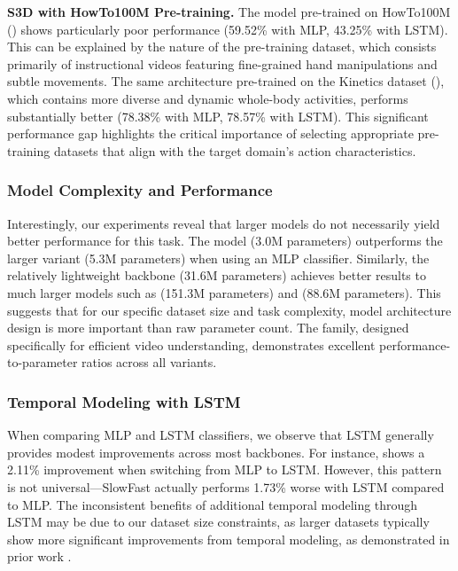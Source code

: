 \noindent\textbf{S3D with HowTo100M Pre-training.}
The  model pre-trained on HowTo100M () shows particularly poor performance (59.52\% with MLP, 43.25\% with LSTM). This can be explained by the nature of the pre-training dataset, which consists primarily of instructional videos featuring fine-grained hand manipulations and subtle movements. The same architecture pre-trained on the Kinetics dataset (), which contains more diverse and dynamic whole-body activities, performs substantially better (78.38\% with MLP, 78.57\% with LSTM). This significant performance gap highlights the critical importance of selecting appropriate pre-training datasets that align with the target domain's action characteristics.

\subsubsection{Model Complexity and Performance}
Interestingly, our experiments reveal that larger models do not necessarily yield better performance for this task. The  model (3.0M parameters) outperforms the larger  variant (5.3M parameters) when using an MLP classifier. Similarly, the relatively lightweight  backbone (31.6M parameters) achieves better results to much larger models such as  (151.3M parameters) and  (88.6M parameters). This suggests that for our specific dataset size and task complexity, model architecture design is more important than raw parameter count. The  family, designed specifically for efficient video understanding, demonstrates excellent performance-to-parameter ratios across all variants.

\subsubsection{Temporal Modeling with LSTM}
When comparing MLP and LSTM classifiers, we observe that LSTM generally provides modest improvements across most backbones. For instance,  shows a 2.11\% improvement when switching from MLP to LSTM. However, this pattern is not universal—SlowFast actually performs 1.73\% worse with LSTM compared to MLP. The inconsistent benefits of additional temporal modeling through LSTM may be due to our dataset size constraints, as larger datasets typically show more significant improvements from temporal modeling, as demonstrated in prior work \cite{action-clip}.

